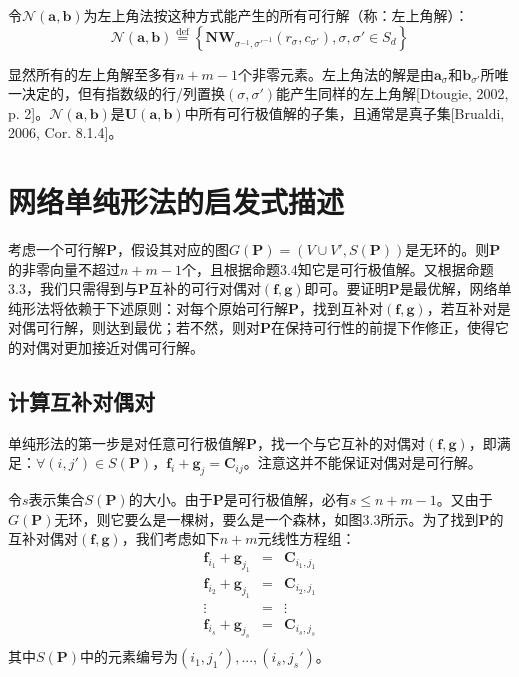 \documentclass[cn,10pt,math=newtx,citestyle=gb7714-2015,bibstyle=gb7714-2015]{elegantbook}
\begin{document}
令$\mathcal{N}(\mathbf{a,b})$为左上角法按这种方式能产生的所有可行解（称：左上角解）：
\begin{equation*}
    \mathcal{N}(\mathbf{a,b})\overset{\text{def}}{=}\left\{ \mathbf{NW}_{\sigma^{-1},\sigma'^{-1}}(r_\sigma,c_{\sigma'}), \sigma,\sigma'\in S_d \right\}
\end{equation*}

显然所有的左上角解至多有$n+m-1$个非零元素。左上角法的解是由$\mathbf{a}_\sigma$和$\mathbf{b}_{\sigma'}$所唯一决定的，但有指数级的行/列置换$(\sigma,\sigma')$能产生同样的左上角解[Dtougie, 2002, p. 2]。$\mathcal{N}(\mathbf{a,b})$是$\mathbf{U(a,b)}$中所有可行极值解的子集，且通常是真子集[Brualdi, 2006, Cor. 8.1.4]。

\section{网络单纯形法的启发式描述}

考虑一个可行解$\mathbf{P}$，假设其对应的图$G(\mathbf{P})=(V\cup V',S(\mathbf{P}))$是无环的。则$\mathbf{P}$的非零向量不超过$n+m-1$个，且根据命题3.4知它是可行极值解。又根据命题3.3，我们只需得到与$\mathbf{P}$互补的可行对偶对$(\mathbf{f,g})$即可。要证明$\mathbf{P}$是最优解，网络单纯形法将依赖于下述原则：对每个原始可行解$\mathbf{P}$，找到互补对$(\mathbf{f,g})$，若互补对是对偶可行解，则达到最优；若不然，则对$\mathbf{P}$在保持可行性的前提下作修正，使得它的对偶对更加接近对偶可行解。

\subsection{计算互补对偶对}

单纯形法的第一步是对任意可行极值解$\mathbf{P}$，找一个与它互补的对偶对$(\mathbf{f,g})$，即满足：$\forall (i,j')\in S(\mathbf{P})$，$\mathbf{f}_i+\mathbf{g}_j=\mathbf{C}_{ij}$。注意这并不能保证对偶对是可行解。

令$s$表示集合$S(\mathbf{P})$的大小。由于$\mathbf{P}$是可行极值解，必有$s\leq n+m-1$。又由于$G(\mathbf{P})$无环，则它要么是一棵树，要么是一个森林，如图3.3所示。为了找到$\mathbf{P}$的互补对偶对$(\mathbf{f,g})$，我们考虑如下$n+m$元线性方程组：
\begin{equation}
    \label{3.6}
    \begin{array}{ccc}
    \mathbf{f}_{i_1}+\mathbf{g}_{j_1} & = & \mathbf{C}_{i_1,j_1}\\
    \mathbf{f}_{i_2}+\mathbf{g}_{j_1} & = & \mathbf{C}_{i_2,j_1}\\
    \vdots & = & \vdots \\
    \mathbf{f}_{i_s}+\mathbf{g}_{j_s} & = & \mathbf{C}_{i_s,j_s}\\
    \end{array}
\end{equation}
其中$S(\mathbf{P})$中的元素编号为$(i_1,j_1'),...,(i_s,j_s')$。
\end{document}
